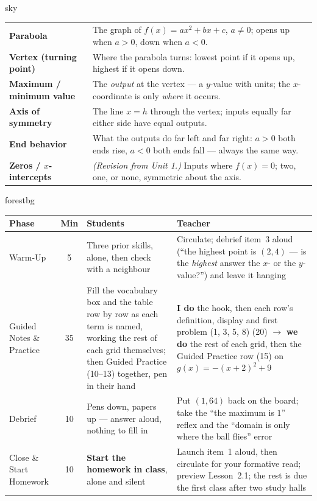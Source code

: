 \documentclass[10pt]{article}
\newcommand{\MeetingLength}{60 minutes}
\begin{document}
\boxguard
\begin{skillbox}{sky}
\renewcommand{\arraystretch}{1.3}
\begin{tabularx}{\linewidth}{@{}l X@{}}
\textbf{Parabola} & The graph of $f(x)=ax^2+bx+c$, $a\ne0$; opens up when $a>0$, down when $a<0$. \\
\textbf{Vertex (turning point)} & Where the parabola turns: lowest point if it opens up, highest if it opens down. \\
\textbf{Maximum / minimum value} & The \emph{output} at the vertex --- a $y$-value with units; the $x$-coordinate is only \emph{where} it occurs. \\
\textbf{Axis of symmetry} & The line $x=h$ through the vertex; inputs equally far either side have equal outputs. \\
\textbf{End behavior} & What the outputs do far left and far right: $a>0$ both ends rise, $a<0$ both ends fall --- always the same way. \\
\textbf{Zeros / $x$-intercepts} & \emph{(Revision from Unit 1.)} Inputs where $f(x)=0$; two, one, or none, symmetric about the axis. \\
\end{tabularx}
\end{skillbox}

\begin{fixedskillbox}[Lesson at a Glance --- \MeetingLength]{forestbg}
\renewcommand{\arraystretch}{1.25}
\begin{tabularx}{\linewidth}{@{}l c X X@{}}
\textbf{Phase} & \textbf{Min} & \textbf{Students} & \textbf{Teacher} \\
\hline
Warm-Up & 5 & Three prior skills, alone, then check with a neighbour & Circulate; debrief item~3
  aloud (``the highest point is $(2,4)$ --- is the \emph{highest} answer the $x$- or the
  $y$-value?'') and leave it hanging \\
Guided Notes \& Practice & 35 & Fill the vocabulary box and the table row by row as each term is
  named, working the rest of each grid themselves; then Guided Practice (10--13) together, pen in
  their hand & \textbf{I do} the hook, then each row's definition, display and first problem
  (1, 3, 5, 8) (20) $\to$ \textbf{we do} the rest of each grid, then the Guided Practice row (15)
  on $g(x)=-(x+2)^2+9$ \\
Debrief & 10 & Pens down, papers up --- answer aloud, nothing to fill in & Put $(1,64)$ back on
  the board; take the ``the maximum is $1$'' reflex and the ``domain is only where the ball
  flies'' error \\
Close \& Start Homework & 10 & \textbf{Start the homework in class}, alone and silent & Launch
  item~1 aloud, then circulate for your formative read; preview Lesson~2.1; the rest is due the
  first class after two study halls \\
\end{tabularx}
\end{fixedskillbox}
\end{document}

